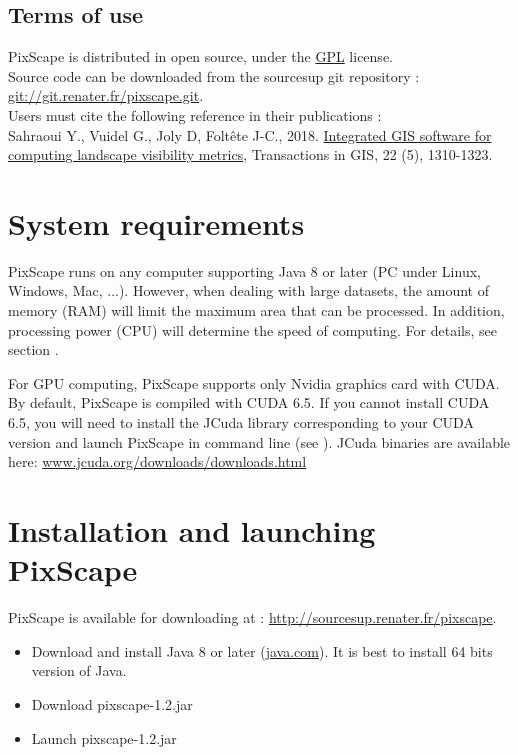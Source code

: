 \documentclass{report}
\begin{document}
\subsection{Terms of use}
PixScape is distributed in open source, under the \href{https://www.gnu.org/licenses/gpl-3.0.html}{GPL} license.\\
Source code can be downloaded from the sourcesup git repository : \url{git://git.renater.fr/pixscape.git}.\\
Users must cite the following reference in their publications :\\
Sahraoui Y., Vuidel G., Joly D, Foltête J-C., 2018. \href{http://dx.doi.org/10.1111/tgis.12457}{Integrated GIS software for computing landscape visibility metrics}, Transactions in GIS, 22 (5), 1310-1323. 


\section{System requirements}

PixScape runs on any computer supporting Java 8 or later (PC under Linux, Windows, Mac, ...). 
However, when dealing with large datasets, the amount of memory (RAM) will limit the maximum area that can be processed. In addition, processing power (CPU) will determine the speed of computing. For details, see section .

For GPU computing, PixScape supports only Nvidia graphics card with CUDA. By default, PixScape is compiled with CUDA 6.5. If you cannot install CUDA 6.5, you will need to install the JCuda library corresponding to your CUDA version and launch PixScape in command line (see ). JCuda binaries are available here: \href{http://www.jcuda.org/downloads/downloads.html}{www.jcuda.org/downloads/downloads.html}

\section{Installation and launching PixScape}

PixScape is available for downloading at : \url{http://sourcesup.renater.fr/pixscape}.

\begin{itemize}
	\item Download and install Java 8 or later (\href{http://www.java.com}{java.com}). It is best to install 64 bits version of Java.
	\item Download pixscape-1.2.jar
	\item Launch pixscape-1.2.jar
\end{itemize}
\end{document}
